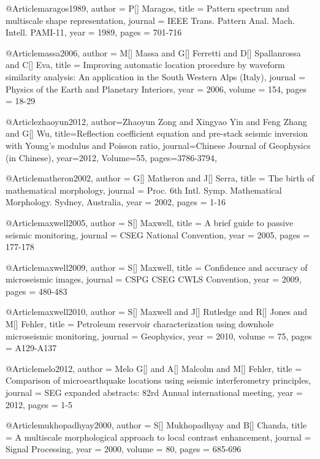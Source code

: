      @Article{maragos1989,
  author = 	 {P[] Maragos},
  title = 	 {Pattern spectrum and multiscale shape representation},
  journal = 	 {IEEE Trans. Pattern Anal.
Mach. Intell. PAMI-11},
  year = 	 1989,
  pages = 	 {701-716}}     
  

     @Article{massa2006,
  author = 	 {M[] Massa and G[] Ferretti and D[] Spallanrossa and C[] Eva},
  title = 	 {Improving automatic location procedure by waveform similarity analysis: An application in the South Western Alps (Italy)},
  journal = 	 {Physics of the Earth and Planetary Interiors},
  year = 	 2006,
  volume = 	 154,
  pages = 	 {18-29}}  



@Article{zhaoyun2012,
  author={Zhaoyun Zong and Xingyao Yin and Feng Zhang and G[] Wu},
  title={Reflection coefficient equation and pre-stack seismic inversion with Young's modulus and Poisson ratio},
  journal={Chinese Journal of Geophysics (in Chinese)},
  year=2012,
  Volume=55,
  pages={3786-3794},
}


  
  
      @Article{matheron2002,
  author = 	 {G[] Matheron and J[] Serra},
  title = 	 {The birth of mathematical morphology},
  journal = 	 {Proc. 6th Intl. Symp.
Mathematical Morphology. Sydney, Australia},
  year = 	 2002,
  pages = 	 {1-16}}   

     @Article{maxwell2005,
  author = 	 {S[] Maxwell},
  title = 	 {A brief guide to passive seismic monitoring},
  journal = 	 {CSEG National Convention},
  year = 	 2005,
  pages = 	 {177-178}}   
  
     @Article{maxwell2009,
  author = 	 {S[] Maxwell},
  title = 	 {Confidence and accuracy of microseismic images},
  journal = 	 {CSPG CSEG CWLS Convention},
  year = 	 2009,
  pages = 	 {480-483}}   
  
    
     @Article{maxwell2010,
  author = 	 {S[] Maxwell and J[] Rutledge and R[] Jones and M[] Fehler},
  title = 	 {Petroleum reservoir characterization using downhole microseismic monitoring},
  journal = 	 {Geophysics},
  year = 	 2010,
  volume = 	 75,
  pages = 	 {A129-A137}}  


     @Article{melo2012,
  author = 	 {Melo G[] and A[] Malcolm and M[] Fehler},
  title = 	 {Comparison of microearthquake locations using seismic interferometry principles},
  journal = 	 {SEG expanded abstracts: 82rd Annual international meeting},
  year = 	 2012,
  pages = 	 {1-5}}  
  
      @Article{mukhopadhyay2000,
  author = 	 {S[] Mukhopadhyay and B[] Chanda},
  title = 	 {A multiscale morphological approach to local contrast enhancement},
  journal = 	 {Signal Processing},
  year = 	 2000,
  volume = 	 80,
  pages = 	 {685-696}} 


